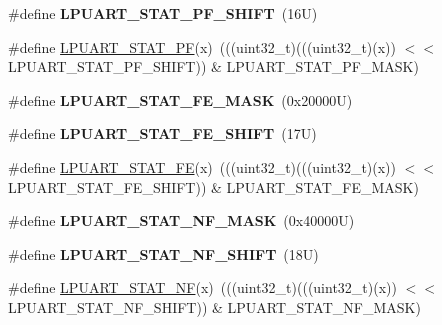 \begin{DoxyCompactItemize}
\item 
\mbox{\label{group___l_p_u_a_r_t___register___masks_ga9a80212e9f92b06a2e246bcaf95d51b5}} 
\#define {\bfseries L\+P\+U\+A\+R\+T\+\_\+\+S\+T\+A\+T\+\_\+\+P\+F\+\_\+\+S\+H\+I\+FT}~(16\+U)
\item 
\#define \mbox{\hyperlink{group___l_p_u_a_r_t___register___masks_gaa2cb11e6fe0b36086a9f68abb78bc2c7}{L\+P\+U\+A\+R\+T\+\_\+\+S\+T\+A\+T\+\_\+\+PF}}(x)~(((uint32\+\_\+t)(((uint32\+\_\+t)(x)) $<$$<$ L\+P\+U\+A\+R\+T\+\_\+\+S\+T\+A\+T\+\_\+\+P\+F\+\_\+\+S\+H\+I\+FT)) \& L\+P\+U\+A\+R\+T\+\_\+\+S\+T\+A\+T\+\_\+\+P\+F\+\_\+\+M\+A\+SK)
\item 
\mbox{\label{group___l_p_u_a_r_t___register___masks_gae836c8c3b467890c3e412aac26e46ca1}} 
\#define {\bfseries L\+P\+U\+A\+R\+T\+\_\+\+S\+T\+A\+T\+\_\+\+F\+E\+\_\+\+M\+A\+SK}~(0x20000\+U)
\item 
\mbox{\label{group___l_p_u_a_r_t___register___masks_gaea08806016e20f5ab03918328d89cdf0}} 
\#define {\bfseries L\+P\+U\+A\+R\+T\+\_\+\+S\+T\+A\+T\+\_\+\+F\+E\+\_\+\+S\+H\+I\+FT}~(17\+U)
\item 
\#define \mbox{\hyperlink{group___l_p_u_a_r_t___register___masks_gab09ef4ae0a9eeb5abbe0808c296478a0}{L\+P\+U\+A\+R\+T\+\_\+\+S\+T\+A\+T\+\_\+\+FE}}(x)~(((uint32\+\_\+t)(((uint32\+\_\+t)(x)) $<$$<$ L\+P\+U\+A\+R\+T\+\_\+\+S\+T\+A\+T\+\_\+\+F\+E\+\_\+\+S\+H\+I\+FT)) \& L\+P\+U\+A\+R\+T\+\_\+\+S\+T\+A\+T\+\_\+\+F\+E\+\_\+\+M\+A\+SK)
\item 
\mbox{\label{group___l_p_u_a_r_t___register___masks_ga9c634f037381367cfdccc71d5ffeea9c}} 
\#define {\bfseries L\+P\+U\+A\+R\+T\+\_\+\+S\+T\+A\+T\+\_\+\+N\+F\+\_\+\+M\+A\+SK}~(0x40000\+U)
\item 
\mbox{\label{group___l_p_u_a_r_t___register___masks_gafb6046993f32c5f3ea3ac2184ec07b5e}} 
\#define {\bfseries L\+P\+U\+A\+R\+T\+\_\+\+S\+T\+A\+T\+\_\+\+N\+F\+\_\+\+S\+H\+I\+FT}~(18\+U)
\item 
\#define \mbox{\hyperlink{group___l_p_u_a_r_t___register___masks_ga9627eb51d2b2868d3e75de33fe64f566}{L\+P\+U\+A\+R\+T\+\_\+\+S\+T\+A\+T\+\_\+\+NF}}(x)~(((uint32\+\_\+t)(((uint32\+\_\+t)(x)) $<$$<$ L\+P\+U\+A\+R\+T\+\_\+\+S\+T\+A\+T\+\_\+\+N\+F\+\_\+\+S\+H\+I\+FT)) \& L\+P\+U\+A\+R\+T\+\_\+\+S\+T\+A\+T\+\_\+\+N\+F\+\_\+\+M\+A\+SK)
$$
\end{DoxyCompactItemize}
